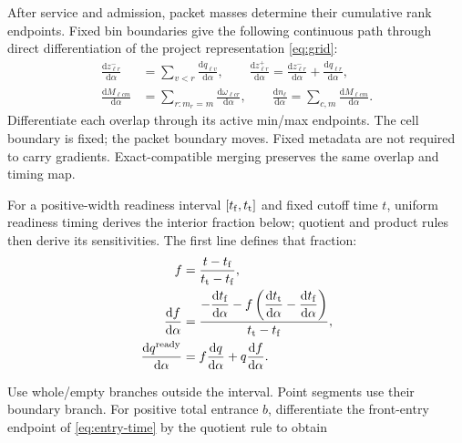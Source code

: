 \documentclass[10pt,a4paper]{article}
\newcommand{\rev}[1]{{\color{revisionred}#1}}
\begin{document}
After service and admission, packet masses determine their cumulative
rank endpoints. Fixed bin boundaries give the following continuous path
through \rev{direct differentiation of the project representation \eqref{eq:grid}}:
\begin{equation}
 \begin{aligned}
 \frac{\mathrm dz^-_{\ell r}}{\mathrm d\alpha}
 &=\sum_{v<r}\frac{\mathrm dq_{\ell v}}{\mathrm d\alpha},\qquad
 \frac{\mathrm dz^+_{\ell r}}{\mathrm d\alpha}
 =\frac{\mathrm dz^-_{\ell r}}{\mathrm d\alpha}
                  +\frac{\mathrm dq_{\ell r}}{\mathrm d\alpha},\\
 \frac{\mathrm dM_{\ell cm}}{\mathrm d\alpha}
 &=\sum_{r:m_r=m}\frac{\mathrm d\omega_{\ell cr}}{\mathrm d\alpha},
 \qquad
 \frac{\mathrm dn_\ell}{\mathrm d\alpha}
 =\sum_{c,m}\frac{\mathrm dM_{\ell cm}}{\mathrm d\alpha}.
 \end{aligned}
 \label{eq:grid-derivative}
\end{equation}
Differentiate each overlap through its active min/max endpoints. The
cell boundary is fixed; the packet boundary moves. Fixed metadata are
not required to carry gradients. Exact-compatible merging preserves the
same overlap and timing map.

\par\begin{samepage}
For a positive-width readiness interval $[t_{\rm f},t_{\rm t}]$ and
fixed cutoff time $t$,
\rev{uniform readiness timing derives the interior fraction below; quotient and product rules then derive its sensitivities.}
The first line defines that fraction:
\begin{equation}
 \begin{aligned}
 f&=\frac{t-t_{\rm f}}{t_{\rm t}-t_{\rm f}},\\
 \frac{\mathrm df}{\mathrm d\alpha}
 &=\frac{\displaystyle
 -\frac{\mathrm dt_{\rm f}}{\mathrm d\alpha}
 -f\left(\frac{\mathrm dt_{\rm t}}{\mathrm d\alpha}
                 -\frac{\mathrm dt_{\rm f}}{\mathrm d\alpha}\right)}
 {t_{\rm t}-t_{\rm f}},\\
 \frac{\mathrm dq^{\rm ready}}{\mathrm d\alpha}
 &=f\frac{\mathrm dq}{\mathrm d\alpha}
                       +q\frac{\mathrm df}{\mathrm d\alpha}.
 \end{aligned}
 \label{eq:eligibility-derivative}
\end{equation}
\par\end{samepage}

Use whole/empty branches outside the interval. Point segments use their
boundary branch. For positive total entrance $b$, differentiate the
front-entry endpoint of \eqref{eq:entry-time}
\rev{by the quotient rule to obtain}
\end{document}
